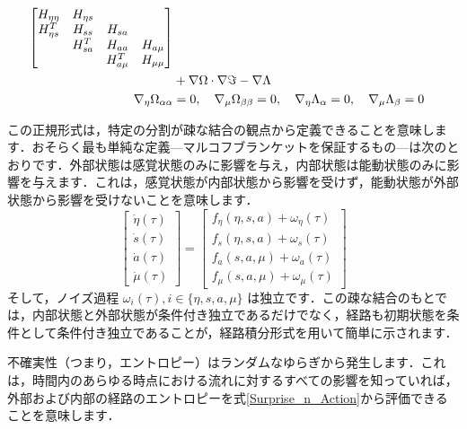 \documentclass[a4paper, titlepage]{jsarticle}
\begin{document}
\begin{equation}
\begin{aligned}
        \begin{bmatrix}
            H_{\eta\eta} & H_{\eta s} \\
            H_{\eta s}^T & H_{ss} & H_{sa} \\
             & H_{sa}^T & H_{aa} & H_{a\mu} \\
             & & H_{a\mu}^T & H_{\mu\mu}
        \end{bmatrix} \\
        &+ \nabla\Omega \cdot \nabla\imaginary - \nabla\Lambda \\
        \nabla_{\eta}\Omega_{\alpha\alpha} &= 0, \quad \nabla_{\mu}\Omega_{\beta\beta} = 0, \quad \nabla_{\eta}\Lambda_{\alpha} = 0, \quad \nabla_{\mu}\Lambda_{\beta} = 0
    \end{aligned}
\end{equation}
\par
この正規形式は，特定の分割が疎な結合の観点から定義できることを意味します．おそらく最も単純な定義—マルコフブランケットを保証するもの—は次のとおりです．外部状態は感覚状態のみに影響を与え，内部状態は能動状態のみに影響を与えます．これは，感覚状態が内部状態から影響を受けず，能動状態が外部状態から影響を受けないことを意味します．
\begin{equation}
    \begin{bmatrix}
        \dot{\eta}(\tau) \\
        \dot{s}(\tau) \\
        \dot{a}(\tau) \\
        \dot{\mu}(\tau)
    \end{bmatrix}
    = \begin{bmatrix}
        f_{\eta}(\eta, s, a) + \omega_{\eta}(\tau) \\
        f_{s}(\eta, s, a) + \omega_{s}(\tau) \\
        f_{a}(s, a, \mu) + \omega_{a}(\tau) \\
        f_{\mu}(s, a, \mu) + \omega_{\mu}(\tau)
    \end{bmatrix}
\end{equation}
そして，ノイズ過程 $\omega_i(\tau), i \in \{\eta, s, a, \mu\}$ は独立です．この疎な結合のもとでは，内部状態と外部状態が条件付き独立であるだけでなく，経路も初期状態を条件として条件付き独立であることが，経路積分形式を用いて簡単に示されます．
\par
不確実性（つまり，エントロピー）はランダムなゆらぎから発生します．これは，時間内のあらゆる時点における流れに対するすべての影響を知っていれば，外部および内部の経路のエントロピーを式\eqref{Surprise_n_Action}から評価できることを意味します．
\end{document}
